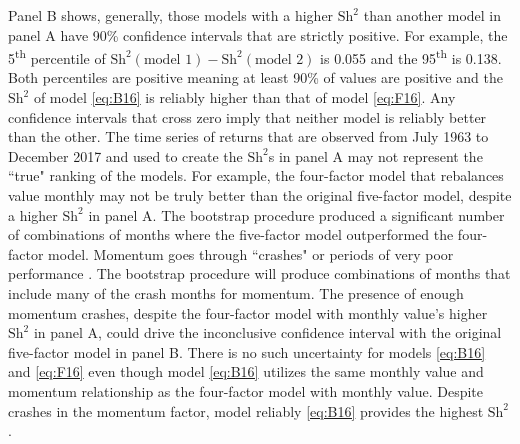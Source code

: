 Panel B shows, generally, those models with a higher $\text{Sh}^2$ than another
model in panel A have 90\% confidence intervals that are strictly positive.
For example, the 5\textsuperscript{th} percentile of
$\text{Sh}^2(\text{model 1})-\text{Sh}^2(\text{model 2})$ is 0.055 and the
95\textsuperscript{th} is 0.138.
Both percentiles are positive meaning at least 90\% of values are positive
and the $\text{Sh}^2$ of model \ref{eq:B16} is reliably higher than that of model \ref{eq:F16}.
Any confidence intervals that cross zero imply that neither model is reliably
better than the other.
The time series of returns that are observed from July 1963 to December 2017
and used to create the $\text{Sh}^2$s in panel A may not represent the ``true"
ranking of the models.
For example, the four-factor model that rebalances value monthly may not be
truly better than the original five-factor model, despite a higher
$\text{Sh}^2$ in panel A.
The bootstrap procedure produced a significant number of combinations of months
where the five-factor model outperformed the four-factor model.
Momentum goes through ``crashes" or periods of very poor performance
\parencite{daniel2016momentum, barroso2015momentum}.
The bootstrap procedure will produce combinations of months that include
many of the crash months for momentum.
The presence of enough momentum crashes, despite the four-factor model with
monthly value's higher $\text{Sh}^2$ 
in panel A, could drive the inconclusive confidence interval with the original
five-factor model in panel B.
There is no such uncertainty for models \ref{eq:B16} and \ref{eq:F16}
even though model \ref{eq:B16} utilizes the same monthly value and momentum
relationship as the four-factor model with monthly value.
Despite crashes in the momentum factor, model reliably \ref{eq:B16} provides
the highest $\text{Sh}^2$.

